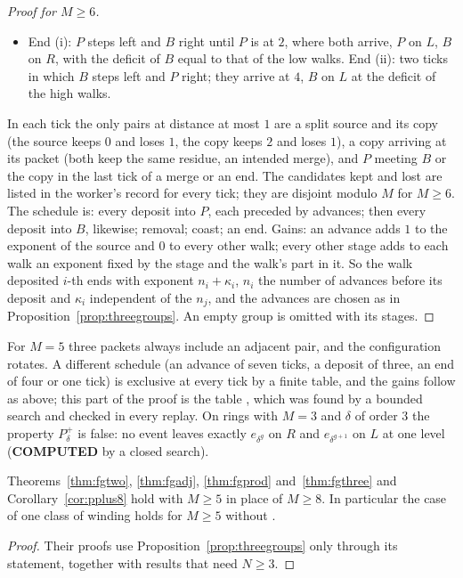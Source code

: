 \begin{proof}[Proof for $M\ge6$]
\begin{itemize}
\item End (i): $P$ steps left and $B$ right until $P$ is at $2$, where both arrive, $P$ on $L$, $B$ on $R$, with the deficit of $B$ equal to that of the low walks. End (ii): two ticks in which $B$ steps left and $P$ right; they arrive at $4$, $B$ on $L$ at the deficit of the high walks.
\end{itemize}
In each tick the only pairs at distance at most $1$ are a split source and its copy (the source keeps $0$ and loses $1$, the copy keeps $2$ and loses $1$), a copy arriving at its packet (both keep the same residue, an intended merge), and $P$ meeting $B$ or the copy in the last tick of a merge or an end. The candidates kept and lost are listed in the worker's record \cite{comptp} for every tick; they are disjoint modulo $M$ for $M\ge6$. The schedule is: every deposit into $P$, each preceded by advances; then every deposit into $B$, likewise; removal; coast; an end. Gains: an advance adds $1$ to the exponent of the source and $0$ to every other walk; every other stage adds to each walk an exponent fixed by the stage and the walk's part in it. So the walk deposited $i$-th ends with exponent $n_i+\kappa_i$, $n_i$ the number of advances before its deposit and $\kappa_i$ independent of the $n_j$, and the advances are chosen as in Proposition~\ref{prop:threegroups}. An empty group is omitted with its stages.
\end{proof}
For $M=5$ three packets always include an adjacent pair, and the configuration rotates. A different schedule (an advance of seven ticks, a deposit of three, an end of four or one tick) is exclusive at every tick by a finite table, and the gains follow as above; this part of the proof is the table \cite{comptp}, which was found by a bounded search and checked in every replay. On rings with $M=3$ and $\delta$ of order $3$ the property $P^{+}_\delta$ is false: no event leaves exactly $e_{\delta^{g}}$ on $R$ and $e_{\delta^{g+1}}$ on $L$ at one level (\textbf{COMPUTED} by a closed search).

\begin{corollary}\label{cor:five}
Theorems~\ref{thm:fgtwo}, \ref{thm:fgadj}, \ref{thm:fgprod} and~\ref{thm:fgthree} and Corollary~\ref{cor:pplus8} hold with $M\ge5$ in place of $M\ge8$. In particular the case of one class of winding holds for $M\ge5$ without \cite{dgone}.
\end{corollary}
\begin{proof}
Their proofs use Proposition~\ref{prop:threegroups} only through its statement, together with results that need $N\ge3$.
\end{proof}


